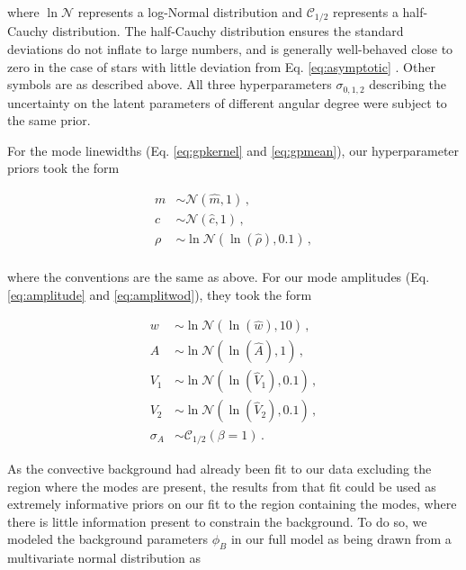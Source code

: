 \noindent where $\ln\mathcal{N}$ represents a log-Normal distribution and $\mathcal{C}_{1/2}$ represents a half-Cauchy distribution. The half-Cauchy distribution ensures the standard deviations do not inflate to large numbers, and is generally well-behaved close to zero in the case of stars with little deviation from Eq. \ref{eq:asymptotic} \cite{gelman2006}. Other symbols are as described above. All three hyperparameters $\sigma_{0,1,2}$ describing the uncertainty on the latent parameters of different angular degree were subject to the same prior.

For the mode linewidths (Eq. \ref{eq:gpkernel} and \ref{eq:gpmean}), our hyperparameter priors took the form

\begin{equation}
	\begin{split}
		m &\sim \mathcal{N}(\hat{m}, 1)\, ,\\
		c &\sim \mathcal{N}(\hat{c}, 1)\, ,\\
		\rho &\sim \ln\mathcal{N}(\ln(\hat{\rho}), 0.1)\, ,\\
	\end{split}
\end{equation}

\noindent where the conventions are the same as above. For our mode amplitudes (Eq. \ref{eq:amplitude} and \ref{eq:amplitwod}), they took the form

\begin{equation}
	\begin{split}
		w &\sim \ln\mathcal{N}(\ln(\hat{w}), 10)\, ,\\
		A &\sim \ln\mathcal{N}(\ln(\hat{A}), 1)\, ,\\
		V_1 &\sim \ln\mathcal{N}(\ln(\hat{V}_1), 0.1)\, ,\\
		V_2 &\sim \ln\mathcal{N}(\ln(\hat{V}_2), 0.1)\, ,\\
		\sigma_A &\sim \mathcal{C}_{1/2}(\beta = 1)\, .
	\end{split}
\end{equation}

As the convective background had already been fit to our data excluding the region where the modes are present, the results from that fit could be used as extremely informative priors on our fit to the region containing the modes, where there is little information present to constrain the background. To do so, we modeled the background parameters $\phi_B$ in our full model as being drawn from a multivariate normal distribution as

